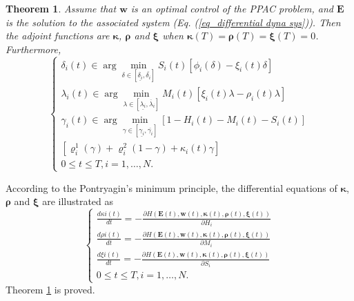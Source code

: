 \documentclass[lettersize,journal]{IEEEtran}
\newtheorem{theorem}{ \textbf{Theorem}}
\begin{document}
\begin{theorem}\label{theo5}
Assume that $\bm{w}$ is an optimal control of the PPAC problem, and $\bm{E}$ is the solution to the associated system (Eq. (\ref{eq_differential dyna sys})). Then the adjoint functions are $\bm{\kappa}$, $\bm{\rho}$ and $\bm{\xi}$ when $\bm{\kappa}(T)=\bm{\rho}(T)=\bm{\xi}(T)=0$. 
Furthermore, 
\begin{equation}\label{eq_co-state-further}
\left\{\begin{array}{l}
\delta_{i}(t) \in \arg \min _{\delta \in\left[\underline{\delta_{i}}, \overline{{\delta}_{i}}\right]} S_{i}(t)\left[\phi_{i}(\delta)-\xi_{i}(t) \delta\right] \\
\lambda_{i}(t) \in \arg \min _{\lambda \in\left[\underline{\lambda_{i}}, \overline{\lambda}_{i}\right]} M_{i}(t)\left[\xi_{i}(t)\lambda-\rho_{i}(t) \lambda\right] \\
\gamma_{i}(t) \in \arg \min _{\gamma \in\left[\underline{\gamma_{i}}, \overline{\gamma_{i}}\right]}\left[1-H_{i}(t)-M_{i}(t)-S_{i}(t)\right]\\
\left[\varrho^1_{i}(\gamma)+\varrho^2_{i}(1-\gamma)+\kappa_{i}(t) \gamma\right] \\

0 \leq t \leq T, i=1, \ldots, N.
\end{array}\right.
\end{equation}

\end{theorem}
\begin{IEEEproof}
According to the Pontryagin’s minimum principle, the differential equations of $\bm{\kappa}$, $\bm{\rho}$ and $\bm{\xi}$ are illustrated as  
\begin{equation}
\left\{\begin{array}{l}
\frac{d \kappa{i}(t)}{d t}=-\frac{\partial H(\mathbf{E}(t), \mathbf{w}(t), \bm{\kappa}(t), \bm{\rho}(t), \bm{\xi}(t))}{\partial H_{i}} \\
\frac{d \rho{i}(t)}{d t}=-\frac{\partial H(\mathbf{E}(t), \mathbf{w}(t), \bm{\kappa}(t), \bm{\rho}(t), \bm{\xi}(t))}{\partial M_{i}} \\
\frac{d \xi{i}(t)}{d t}=-\frac{\partial H(\mathbf{E}(t), \mathbf{w}(t), \bm{\kappa}(t), \bm{\rho}(t), \bm{\xi}(t))}{\partial S_{i}} \\
0 \leq t \leq T, i=1, \ldots, N.
\end{array}\right.
\end{equation}
Theorem \ref{theo5} is proved.
\end{IEEEproof}
\par
\end{document}
